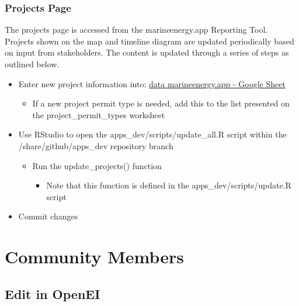 \documentclass[
]{book}
\providecommand{\tightlist}{%
  \setlength{\itemsep}{0pt}\setlength{\parskip}{0pt}}
\begin{document}
\hypertarget{projects-page}{%
\subsection{Projects Page}\label{projects-page}}

The projects page is accessed from the marineenergy.app Reporting Tool. Projects shown on the map and timeline diagram are updated periodically based on input from stakeholders. The content is updated through a series of steps as outlined below.

\begin{itemize}
\tightlist
\item
  Enter new project information into: \href{https://docs.google.com/spreadsheets/d/1MTlWQgBeV4eNbM2JXNXU3Y-_Y6QcOOfjWFyKWfdMIQM/edit?usp=sharing}{data \textbar{} marineenergy.app - Google Sheet}

  \begin{itemize}
  \tightlist
  \item
    If a new project permit type is needed, add this to the list presented on the project\_permit\_types worksheet
  \end{itemize}
\item
  Use RStudio to open the apps\_dev/scripts/update\_all.R script within the /share/github/apps\_dev repository branch

  \begin{itemize}
  \tightlist
  \item
    Run the update\_projects() function

    \begin{itemize}
    \tightlist
    \item
      Note that this function is defined in the apps\_dev/scripts/update.R script
    \end{itemize}
  \end{itemize}
\item
  Commit changes
\end{itemize}

\hypertarget{comm}{%
\chapter{Community Members}\label{comm}}

\hypertarget{edit-in-openei}{%
\section{Edit in OpenEI}\label{edit-in-openei}}
\end{document}
